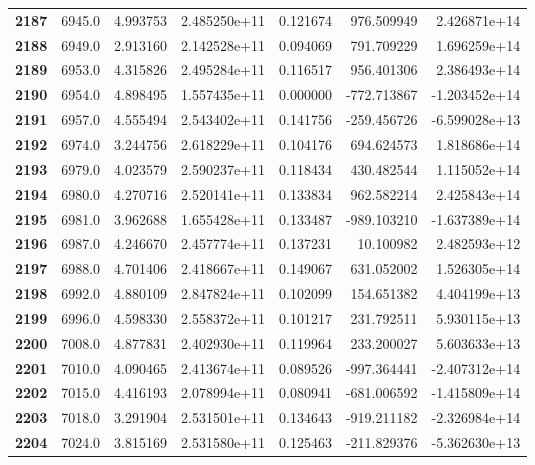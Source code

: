 \documentclass{report}[12pt]
\begin{document}
\begin{center}
\begin{tabular}{lrrrrrr}
\textbf{2187} &         6945.0 &   4.993753 &  2.485250e+11 &    0.121674 &   976.509949 &  2.426871e+14 \\
\textbf{2188} &         6949.0 &   2.913160 &  2.142528e+11 &    0.094069 &   791.709229 &  1.696259e+14 \\
\textbf{2189} &         6953.0 &   4.315826 &  2.495284e+11 &    0.116517 &   956.401306 &  2.386493e+14 \\
\textbf{2190} &         6954.0 &   4.898495 &  1.557435e+11 &    0.000000 &  -772.713867 & -1.203452e+14 \\
\textbf{2191} &         6957.0 &   4.555494 &  2.543402e+11 &    0.141756 &  -259.456726 & -6.599028e+13 \\
\textbf{2192} &         6974.0 &   3.244756 &  2.618229e+11 &    0.104176 &   694.624573 &  1.818686e+14 \\
\textbf{2193} &         6979.0 &   4.023579 &  2.590237e+11 &    0.118434 &   430.482544 &  1.115052e+14 \\
\textbf{2194} &         6980.0 &   4.270716 &  2.520141e+11 &    0.133834 &   962.582214 &  2.425843e+14 \\
\textbf{2195} &         6981.0 &   3.962688 &  1.655428e+11 &    0.133487 &  -989.103210 & -1.637389e+14 \\
\textbf{2196} &         6987.0 &   4.246670 &  2.457774e+11 &    0.137231 &    10.100982 &  2.482593e+12 \\
\textbf{2197} &         6988.0 &   4.701406 &  2.418667e+11 &    0.149067 &   631.052002 &  1.526305e+14 \\
\textbf{2198} &         6992.0 &   4.880109 &  2.847824e+11 &    0.102099 &   154.651382 &  4.404199e+13 \\
\textbf{2199} &         6996.0 &   4.598330 &  2.558372e+11 &    0.101217 &   231.792511 &  5.930115e+13 \\
\textbf{2200} &         7008.0 &   4.877831 &  2.402930e+11 &    0.119964 &   233.200027 &  5.603633e+13 \\
\textbf{2201} &         7010.0 &   4.090465 &  2.413674e+11 &    0.089526 &  -997.364441 & -2.407312e+14 \\
\textbf{2202} &         7015.0 &   4.416193 &  2.078994e+11 &    0.080941 &  -681.006592 & -1.415809e+14 \\
\textbf{2203} &         7018.0 &   3.291904 &  2.531501e+11 &    0.134643 &  -919.211182 & -2.326984e+14 \\
\textbf{2204} &         7024.0 &   3.815169 &  2.531580e+11 &    0.125463 &  -211.829376 & -5.362630e+13 \\

\end{tabular}
\end{center}
\end{document}

